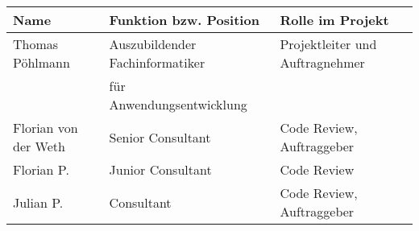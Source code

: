 \begin{tabu}{lll}
\rowfont{\bfseries\leavevmode\color{headingfont}}\textbf{Name} & \textbf{Funktion bzw. Position} & \textbf{Rolle im Projekt} \\
\hline
Thomas Pöhlmann & Auszubildender Fachinformatiker & Projektleiter und Auftragnehmer \\
& für Anwendungsentwicklung & \\
\hline
Florian von der Weth & Senior Consultant & Code Review, Auftraggeber \\
Florian P. & Junior Consultant & Code Review \\
\hline
Julian P. & Consultant & Code Review, Auftraggeber \\
\end{tabu}